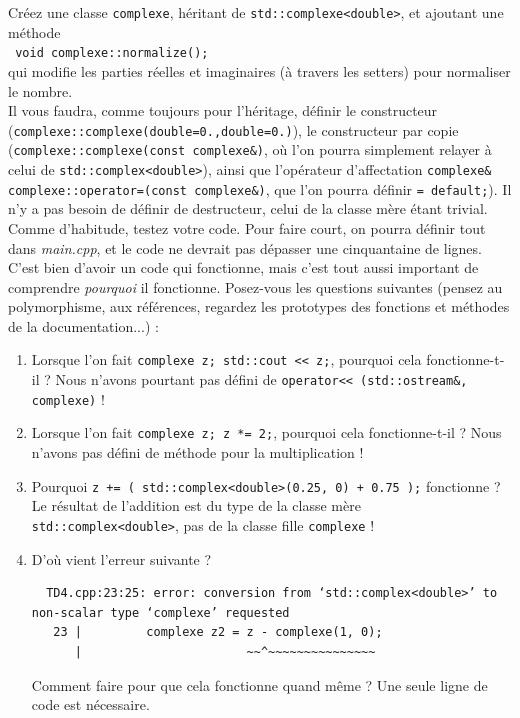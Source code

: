 \documentclass{book}
\newcommand{\inline}[1]{\texttt{#1}}
\def\filename{\emph}
\begin{document}
Créez une classe \inline{complexe}, héritant de \inline{std::complexe<double>}, et ajoutant une méthode\\
\inline{  void complexe::normalize();}\\
qui modifie les parties réelles et imaginaires (à travers les setters) pour normaliser le nombre.\\

Il vous faudra, comme toujours pour l'héritage, définir le constructeur (\inline{complexe::complexe(double=0.,double=0.)}), le constructeur par copie (\inline{complexe::complexe(const complexe&)}, où l'on pourra simplement relayer à celui de \inline{std::complex<double>}), ainsi que l'opérateur d'affectation \inline{complexe& complexe::operator=(const complexe&)}, que l'on pourra définir \inline{= default;}). Il n'y a pas besoin de définir de destructeur, celui de la classe mère étant trivial. Comme d'habitude, testez votre code. Pour faire court, on pourra définir tout dans \filename{main.cpp}, et le code ne devrait pas dépasser une cinquantaine de lignes.\\

C'est bien d'avoir un code qui fonctionne, mais c'est tout aussi important de comprendre \emph{pourquoi} il fonctionne. Posez-vous les questions suivantes (pensez au polymorphisme, aux références, regardez les prototypes des fonctions et méthodes de la documentation...) :
\begin{enumerate}

  \item Lorsque l'on fait \inline{complexe z; std::cout << z;}, pourquoi cela fonctionne-t-il ? Nous n'avons pourtant pas défini de \inline{operator<< (std::ostream&, complexe)} !

  \item Lorsque l'on fait \inline{complexe z; z *= 2;}, pourquoi cela fonctionne-t-il ? Nous n'avons pas défini de méthode pour la multiplication !

  \item Pourquoi \inline{z += ( std::complex<double>(0.25, 0) + 0.75 );} fonctionne ? Le résultat de l'addition est du type de la classe mère \inline{std::complex<double>}, pas de la classe fille \inline{complexe} !

  \item D'où vient l'erreur suivante ?
\begin{verbatim}
  TD4.cpp:23:25: error: conversion from ‘std::complex<double>’ to non-scalar type ‘complexe’ requested
   23 |         complexe z2 = z - complexe(1, 0);
      |                       ~~^~~~~~~~~~~~~~~~
\end{verbatim}
  Comment faire pour que cela fonctionne quand même ? Une seule ligne de code est nécessaire.

\end{enumerate}
\end{document}
